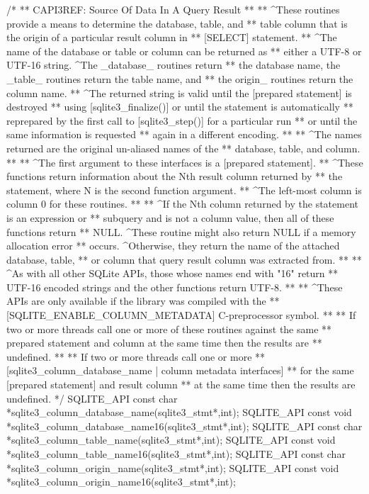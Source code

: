 \begin{Codex}[label=sqlite3.h,numbers=left]
{/*
** CAPI3REF: Source Of Data In A Query Result
**
** ^These routines provide a means to determine the database, table, and
** table column that is the origin of a particular result column in
** [SELECT] statement.
** ^The name of the database or table or column can be returned as
** either a UTF-8 or UTF-16 string.  ^The _database_ routines return
** the database name, the _table_ routines return the table name, and
** the origin_ routines return the column name.
** ^The returned string is valid until the [prepared statement] is destroyed
** using [sqlite3_finalize()] or until the statement is automatically
** reprepared by the first call to [sqlite3_step()] for a particular run
** or until the same information is requested
** again in a different encoding.
**
** ^The names returned are the original un-aliased names of the
** database, table, and column.
**
** ^The first argument to these interfaces is a [prepared statement].
** ^These functions return information about the Nth result column returned by
** the statement, where N is the second function argument.
** ^The left-most column is column 0 for these routines.
**
** ^If the Nth column returned by the statement is an expression or
** subquery and is not a column value, then all of these functions return
** NULL.  ^These routine might also return NULL if a memory allocation error
** occurs.  ^Otherwise, they return the name of the attached database, table,
** or column that query result column was extracted from.
**
** ^As with all other SQLite APIs, those whose names end with "16" return
** UTF-16 encoded strings and the other functions return UTF-8.
**
** ^These APIs are only available if the library was compiled with the
** [SQLITE_ENABLE_COLUMN_METADATA] C-preprocessor symbol.
**
** If two or more threads call one or more of these routines against the same
** prepared statement and column at the same time then the results are
** undefined.
**
** If two or more threads call one or more
** [sqlite3_column_database_name | column metadata interfaces]
** for the same [prepared statement] and result column
** at the same time then the results are undefined.
*/
SQLITE_API const char *sqlite3_column_database_name(sqlite3_stmt*,int);
SQLITE_API const void *sqlite3_column_database_name16(sqlite3_stmt*,int);
SQLITE_API const char *sqlite3_column_table_name(sqlite3_stmt*,int);
SQLITE_API const void *sqlite3_column_table_name16(sqlite3_stmt*,int);
SQLITE_API const char *sqlite3_column_origin_name(sqlite3_stmt*,int);
SQLITE_API const void *sqlite3_column_origin_name16(sqlite3_stmt*,int);

}
\end{Codex}
